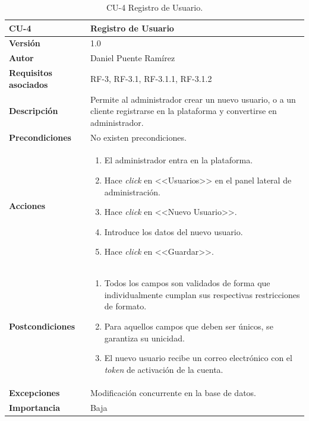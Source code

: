 \begin{table}[p]
\centering
\begin{tabularx}{\linewidth}{ p{} p{} }
\toprule
\textbf{CU-4} & \textbf{Registro de Usuario}\\
\toprule
\textbf{Versión} & 1.0\\
\textbf{Autor} & Daniel Puente Ramírez\\
\textbf{Requisitos asociados} & RF-3, RF-3.1, RF-3.1.1, RF-3.1.2\\
\textbf{Descripción} & Permite al administrador crear un nuevo usuario, o a un cliente registrarse en la plataforma y convertirse en administrador.\\
\textbf{Precondiciones} & No existen precondiciones.\\
\textbf{Acciones} &
\begin{enumerate}
\def\labelenumi{\arabic{enumi}.}
\tightlist
\item El administrador entra en la plataforma.
\item Hace \textit{click} en <<Usuarios>> en el panel lateral de administración.
\item Hace \textit{click} en <<Nuevo Usuario>>.
\item Introduce los datos del nuevo usuario.
\item Hace \textit{click} en <<Guardar>>.
\end{enumerate}\\
\textbf{Postcondiciones} & 
\begin{enumerate}
\tightlist
\item Todos los campos son validados de forma que individualmente cumplan sus respectivas restricciones de formato.
\item Para aquellos campos que deben ser únicos, se garantiza su unicidad.
\item El nuevo usuario recibe un correo electrónico con el \textit{token} de activación de la cuenta.
\end{enumerate}\\
\textbf{Excepciones} & Modificación concurrente en la base de datos.\\
\textbf{Importancia} & Baja \\
\bottomrule
\end{tabularx}
\caption{CU-4 Registro de Usuario.}
\end{table}

